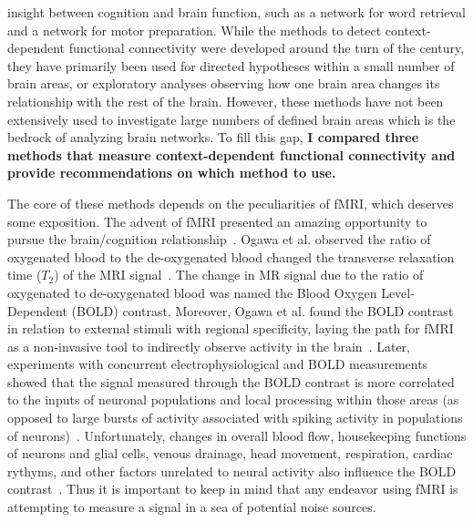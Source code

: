 \documentclass[phd,appendix,figures]{uithesis}
\begin{document}
insight between cognition and brain function, such as a network for word retrieval and
a network for motor preparation.
While the methods to detect context-dependent functional connectivity
were developed around the turn of the century, they have primarily
been used for directed hypotheses within a small number of brain areas, or
exploratory analyses observing how one brain area changes its relationship
with the rest of the brain.
However, these methods have not been extensively used to investigate large numbers of defined
brain areas which is the bedrock of analyzing brain networks.
To fill this gap, \textbf{I compared three methods that measure context-dependent functional connectivity
and provide recommendations on which method to use.}

The core of these methods depends on the peculiarities of fMRI, which deserves some exposition.
The advent of fMRI presented an amazing opportunity
to pursue the brain/cognition relationship~\cite{ogawa1990,Ogawa1992}.
Ogawa et al. observed the ratio of oxygenated blood to the de-oxygenated blood changed the transverse
relaxation time ($T_2$) of the MRI signal~\cite{ogawa1990}.
The change in MR signal due to the ratio of oxygenated to de-oxygenated blood was named the
Blood Oxygen Level-Dependent (BOLD) contrast. 
Moreover, Ogawa et al. found the BOLD contrast in
relation to external stimuli with regional specificity, laying the path for fMRI as a non-invasive tool
to indirectly observe activity in the brain~\cite{Ogawa1992}.
Later, experiments with concurrent electrophysiological and BOLD measurements showed that 
the signal measured through the BOLD contrast is more correlated to the inputs of
neuronal populations and local processing within those areas (as opposed to large bursts of activity
associated with spiking activity in populations of neurons)~\cite{Logothetis2001}.
Unfortunately, changes in overall blood flow, housekeeping functions of neurons and glial cells,
venous drainage, head movement, respiration, cardiac rythyms, and other factors unrelated
to neural activity also influence the BOLD contrast~\cite{Attwell2002,Kim2012,Liu2016}.
Thus it is important to keep in mind that any endeavor using fMRI is attempting to measure
a signal in a sea of potential noise sources.
\end{document}
